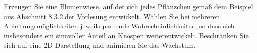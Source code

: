 %
Erzeugen Sie eine Blumenwiese, auf der sich jedes Pflänzchen gemäß dem 
Beispiel aus Abschnitt 8.3.2 der Vorlesung entwickelt. Wählen Sie bei 
mehreren Ableitungsmöglichkeiten jeweils passende Wahrscheinlichkeiten, 
so dass sich insbesondere ein sinnvoller Anteil an Knospen 
weiterentwickelt. Beschränken Sie sich auf eine 2D-Darstellung und 
animieren Sie das Wachstum. 
